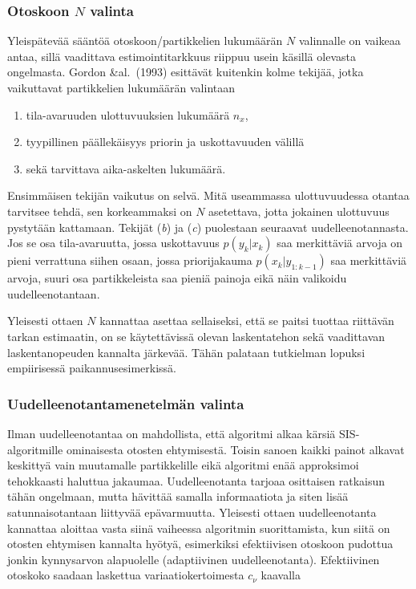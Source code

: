 \documentclass[
  12pt,
  a4paper, twoside]{book}
\providecommand{\tightlist}{%
  \setlength{\itemsep}{0pt}\setlength{\parskip}{0pt}}
\begin{document}
\subsubsection{Otoskoon $N$ valinta}

Yleispätevää sääntöä otoskoon/partikkelien lukumäärän \(N\) valinnalle on vaikeaa antaa, sillä vaadittava estimointitarkkuus riippuu usein käsillä olevasta ongelmasta. Gordon \&al.~(1993) esittävät kuitenkin kolme tekijää, jotka vaikuttavat partikkelien lukumäärän valintaan

\begin{enumerate}
\def\labelenumi{\alph{enumi}.}
\tightlist
\item
  tila-avaruuden ulottuvuuksien lukumäärä \({n_x}\),
\item
  tyypillinen päällekäisyys priorin ja uskottavuuden välillä
\item
  sekä tarvittava aika-askelten lukumäärä.
\end{enumerate}

Ensimmäisen tekijän vaikutus on selvä. Mitä useammassa ulottuvuudessa otantaa tarvitsee tehdä, sen korkeammaksi on \(N\) asetettava, jotta jokainen ulottuvuus pystytään kattamaan. Tekijät (\textit{b}) ja (\textit{c}) puolestaan seuraavat uudelleenotannasta. Jos se osa tila-avaruutta, jossa uskottavuus \(p(y_k|x_k)\) saa merkittäviä arvoja on pieni verrattuna siihen osaan, jossa priorijakauma \(p(x_k|y_{1:k-1})\) saa merkittäviä arvoja, suuri osa partikkeleista saa pieniä painoja eikä näin valikoidu uudelleenotantaan.

Yleisesti ottaen \(N\) kannattaa asettaa sellaiseksi, että se paitsi tuottaa riittävän tarkan estimaatin, on se käytettävissä olevan laskentatehon sekä vaadittavan laskentanopeuden kannalta järkevää. Tähän palataan tutkielman lopuksi empiirisessä paikannusesimerkissä.

\subsubsection{Uudelleenotantamenetelmän valinta}

Ilman uudelleenotantaa on mahdollista, että algoritmi alkaa kärsiä SIS-algoritmille ominaisesta otosten ehtymisestä. Toisin sanoen kaikki painot alkavat keskittyä vain muutamalle partikkelille eikä algoritmi enää approksimoi tehokkaasti haluttua jakaumaa. Uudelleenotanta tarjoaa osittaisen ratkaisun tähän ongelmaan, mutta hävittää samalla informaatiota ja siten lisää satunnaisotantaan liittyvää epävarmuutta. Yleisesti ottaen uudelleenotanta kannattaa aloittaa vasta siinä vaiheessa algoritmin suorittamista, kun siitä on otosten ehtymisen kannalta hyötyä, esimerkiksi efektiivisen otoskoon pudottua jonkin kynnysarvon alapuolelle (adaptiivinen uudelleenotanta). Efektiivinen otoskoko saadaan laskettua variaatiokertoimesta \(c_\nu\) kaavalla
\end{document}

